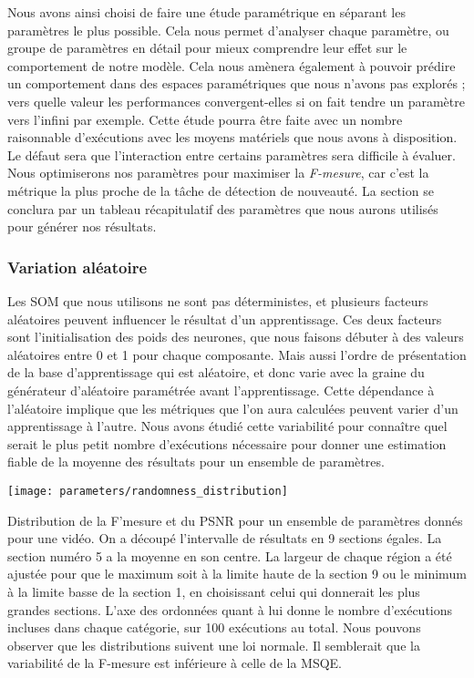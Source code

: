 	Nous avons ainsi choisi de faire une étude paramétrique en séparant les paramètres le plus possible. Cela nous permet d'analyser chaque paramètre, ou groupe de paramètres en détail pour mieux comprendre leur effet sur le comportement de notre modèle. Cela nous amènera également à pouvoir prédire un comportement dans des espaces paramétriques que nous n'avons pas explorés ; vers quelle valeur les performances convergent-elles si on fait tendre un paramètre vers l'infini par exemple. Cette étude pourra être faite avec un nombre raisonnable d'exécutions avec les moyens matériels que nous avons à disposition. Le défaut sera que l'interaction entre certains paramètres sera difficile à évaluer. Nous optimiserons nos paramètres pour maximiser la \textit{F-mesure}, car c'est la métrique la plus proche de la tâche de détection de nouveauté. La section se conclura par un tableau récapitulatif des paramètres que nous aurons utilisés pour générer nos résultats.

	\subsubsection{Variation aléatoire}

	Les SOM que nous utilisons ne sont pas déterministes, et plusieurs facteurs aléatoires peuvent influencer le résultat d'un apprentissage. Ces deux facteurs sont l'initialisation des poids des neurones, que nous faisons débuter à des valeurs aléatoires entre 0 et 1 pour chaque composante. Mais aussi l'ordre de présentation de la base d'apprentissage qui est aléatoire, et donc varie avec la graine du générateur d'aléatoire paramétrée avant l'apprentissage. Cette dépendance à l'aléatoire implique que les métriques que l'on aura calculées peuvent varier d'un apprentissage à l'autre. Nous avons étudié cette variabilité pour connaître quel serait le plus petit nombre d'exécutions nécessaire pour donner une estimation fiable de la moyenne des résultats pour un ensemble de paramètres. 

	\begin{figureth}
		\texttt{[image: parameters/randomness\_distribution]}
		\caption[Effet de l'aléatoire sur les métriques]{Distribution de la F'mesure et du PSNR pour un ensemble de paramètres donnés pour une vidéo. On a découpé l'intervalle de résultats en 9 sections égales. La section numéro 5 a la moyenne en son centre. La largeur de chaque région a été ajustée pour que le maximum soit à la limite haute de la section 9 ou le minimum à la limite basse de la section 1, en choisissant celui qui donnerait les plus grandes sections. L'axe des ordonnées quant à lui donne le nombre d'exécutions incluses dans chaque catégorie, sur 100 exécutions au total. Nous pouvons observer que les distributions suivent une loi normale. Il semblerait que la variabilité de la F-mesure est inférieure à celle de la MSQE.}\label{fig:params:random}
	\end{figureth}

